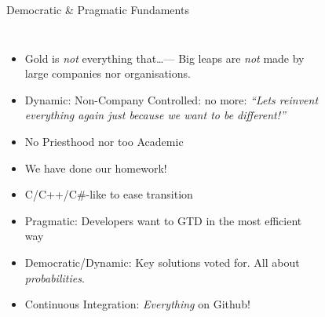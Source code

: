\documentclass[xcolor=dvipsnames]{beamer}
\begin{document}
\begin{frame}[fragile]{Democratic \& Pragmatic Fundaments}
    \begin{columns}[c] %
      \begin{itemize}[<+->]
      \item Gold is \emph{not} everything that\ldots --- Big leaps are
        \emph{not} made by large companies nor organisations.
      \item Dynamic: Non-Company Controlled: no more: \textit{``Lets reinvent
          everything again just because we want to be different!''}
      \item No Priesthood nor too Academic
      \item We have done our homework!
      \item C/C++/C\#-like to ease transition
      \item Pragmatic: Developers want to GTD in the most efficient way
      \item Democratic/Dynamic: Key solutions voted for. All about
        \emph{probabilities}.
      \item Continuous Integration: \emph{Everything} on Github!
      \end{itemize}
      \begin{figure}
      \end{figure}
    \end{columns}
\end{frame}
\end{document}
